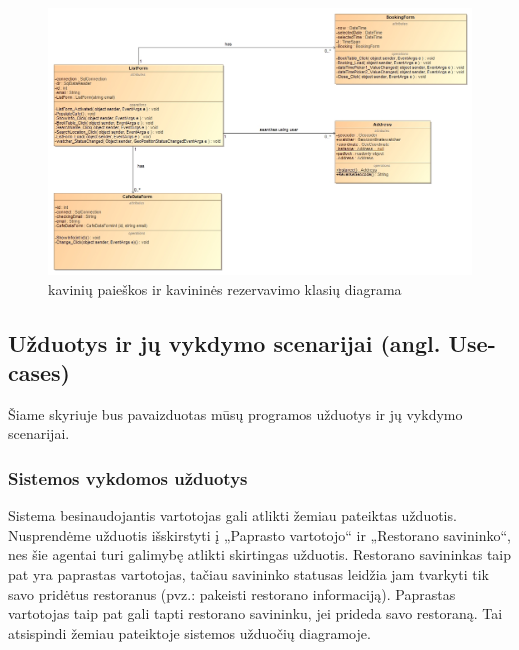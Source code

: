 \documentclass{VUMIFPSkursinis}
\begin{document}
\begin{figure}[H]
    \centering
    \includegraphics[width=\textwidth,height=\textheight,keepaspectratio]{img/LoginForm_Address_Booking} 
    \caption{kavinių paieškos ir kavininės rezervavimo klasių diagrama}
    \label{img:LoginForm_Address_Booking}
\end{figure}
\pagebreak
\subsection{Užduotys ir jų vykdymo scenarijai (angl. Use-cases)}
Šiame skyriuje bus pavaizduotas mūsų programos užduotys ir jų vykdymo scenarijai.
\subsubsection{Sistemos vykdomos užduotys}

Sistema besinaudojantis vartotojas gali atlikti žemiau pateiktas užduotis. Nusprendėme užduotis išskirstyti į „Paprasto vartotojo“ ir „Restorano savininko“, nes šie agentai turi galimybę atlikti skirtingas užduotis. Restorano savininkas taip pat yra paprastas vartotojas, tačiau savininko statusas leidžia jam tvarkyti tik savo pridėtus restoranus (pvz.: pakeisti restorano informaciją). Paprastas vartotojas taip pat gali tapti restorano savininku, jei prideda savo restoraną. Tai atsispindi žemiau pateiktoje sistemos užduočių diagramoje.
\end{document}
